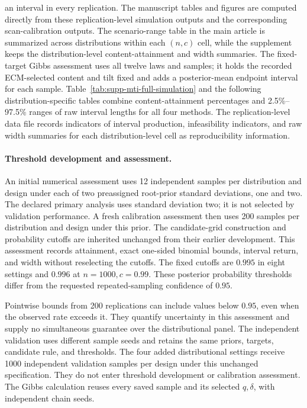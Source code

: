 \documentclass[11pt]{article}
\begin{document}
an interval in every replication. The manuscript tables and figures are
computed directly from these replication-level simulation outputs and the
corresponding scan-calibration outputs. The scenario-range table in the main
article is summarized across distributions within each \((n,c)\) cell, while
the supplement keeps the distribution-level content-attainment and width
summaries. The fixed-target Gibbs assessment uses all twelve laws and
\MTIGibbsExpandedSamples{} samples;
it holds the recorded ECM-selected content and tilt fixed and adds a
posterior-mean endpoint interval for each sample.
Table~\ref{tab:supp-mti-full-simulation} and the following
distribution-specific tables combine content-attainment percentages and
2.5\%--97.5\% ranges of raw interval lengths for all four methods. The
replication-level data file records indicators of interval production,
infeasibility indicators, and raw width summaries for each
distribution-level cell as reproducibility information.

\paragraph{Threshold development and assessment.}
An initial numerical assessment uses 12 independent samples per distribution
and design under each of two preassigned root-prior standard deviations,
one and two. The declared primary analysis uses standard deviation two;
it is not selected by validation performance. A fresh calibration assessment
then uses 200 samples per distribution and design under this prior.
The candidate-grid construction and probability cutoffs are inherited
unchanged from their earlier development. This assessment records attainment,
exact one-sided binomial bounds, interval return, and width without
reselecting the cutoffs.
The fixed cutoffs are \(0.995\) in eight settings and \(0.996\) at
\(n=1000,c=0.99\). These posterior probability thresholds differ from the
requested repeated-sampling confidence of \(0.95\).

Pointwise bounds from 200 replications can include values below \(0.95\),
even when the observed rate exceeds it. They quantify uncertainty in this
assessment and supply no simultaneous guarantee over the distributional
panel. The independent validation uses different sample seeds and retains
the same priors, targets, candidate rule, and thresholds. The four added
distributional settings receive 1000 independent validation samples per
design under this unchanged specification. They do not enter threshold
development or calibration assessment. The Gibbs calculation reuses every
saved sample and its selected \(q,\delta\), with independent chain seeds.
\end{document}
